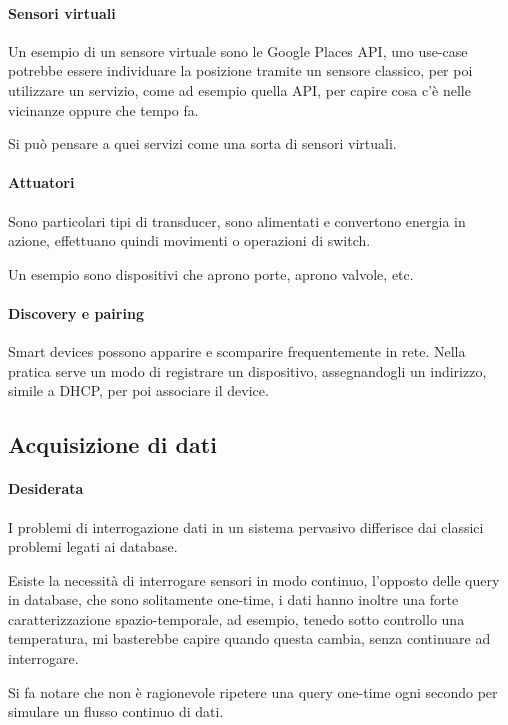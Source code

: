 \paragraph{Sensori virtuali}
Un esempio di un sensore virtuale sono le Google Places API, 
uno use-case potrebbe essere individuare la posizione 
tramite un sensore classico, per poi utilizzare 
un servizio, come ad esempio quella API, per capire cosa c'è 
nelle vicinanze oppure che tempo fa. 

Si può pensare a quei servizi come una sorta di sensori virtuali.

\paragraph{Attuatori}
Sono particolari tipi di transducer, sono alimentati e convertono 
energia in azione, effettuano quindi movimenti o operazioni 
di switch.

Un esempio sono dispositivi che aprono porte, aprono valvole, 
etc.

\paragraph{Discovery e pairing}
Smart devices possono apparire e scomparire frequentemente in rete. 
Nella pratica serve un modo di registrare un dispositivo, assegnandogli un 
indirizzo, simile a DHCP, per poi associare il device.

\subsection{Acquisizione di dati}

\paragraph{Desiderata}
I problemi di interrogazione dati in un sistema pervasivo differisce 
dai classici problemi legati ai database.

Esiste la necessità di interrogare sensori in modo continuo, l'opposto 
delle query in database, che sono solitamente one-time, 
i dati hanno inoltre una forte caratterizzazione spazio-temporale, ad esempio, 
tenedo sotto controllo una temperatura, mi basterebbe capire quando 
questa cambia, senza continuare ad interrogare.

Si fa notare che non è ragionevole ripetere una query one-time ogni secondo 
per simulare un flusso continuo di dati.

